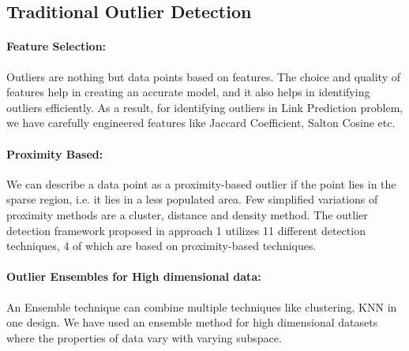 \documentclass[runningheads]{llncs}
\begin{document}

\subsection{Traditional Outlier Detection}


\paragraph*{Feature Selection:}  Outliers are nothing but data points based on features. The choice and quality of features help in creating an accurate model, and it also helps in identifying outliers efficiently. As a result, for identifying outliers in Link Prediction problem, we have carefully engineered features like Jaccard Coefficient, Salton Cosine etc.

\paragraph*{Proximity Based:} We can describe a data point as a proximity-based outlier if the point lies in the sparse region, i.e. it lies in a less populated area. Few simplified variations of proximity methods are a cluster, distance and density method. The outlier detection framework proposed in approach 1 utilizes 11 different detection techniques, 4 of which are based on proximity-based techniques.

\paragraph*{Outlier Ensembles for High dimensional data:} An Ensemble technique can combine multiple techniques like clustering, KNN in one design. We have used an ensemble method for high dimensional datasets where the properties of data vary with varying subspace.
\end{document}

